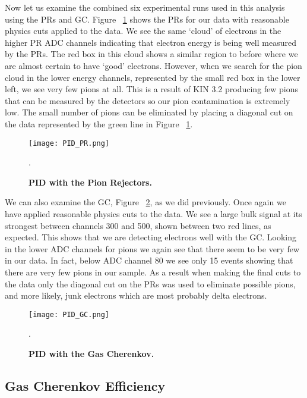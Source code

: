 Now let us examine the combined six experimental runs used in this analysis using the PRs and GC. Figure ~\ref{fig:pid_pr} shows the PRs for our data with reasonable physics cuts applied to the data. We see the same `cloud' of electrons in the higher PR ADC channels indicating that electron energy is being well measured by the PRs. The red box in this cloud shows a similar region to before where we are almost certain to have `good' electrons. However, when we search for the pion cloud in the lower energy channels, represented by the small red box in the lower left, we see very few pions at all. This is a result of KIN 3.2 producing few pions that can be measured by the detectors so our pion contamination is extremely low. The small number of pions can be eliminated by placing a diagonal cut on the data represented by the green line in Figure ~\ref{fig:pid_pr}.

\begin{figure}[!ht]
\begin{center}
\texttt{[image: PID\_PR.png]}
\end{center}
\caption{
{\bf{PID with the Pion Rejectors.}} }.
\label{fig:pid_pr}
\end{figure}

We can also examine the GC, Figure ~\ref{fig:pid_gc}, as we did previously. Once again we have applied reasonable physics cuts to the data. We see a large bulk signal at its strongest between channels 300 and 500, shown between two red lines, as expected. This shows that we are detecting electrons well with the GC. Looking in the lower ADC channels for pions we again see that there seem to be very few in our data. In fact, below ADC channel 80 we see only 15 events showing that there are very few pions in our sample. As a result when making the final cuts to the data only the diagonal cut on the PRs was used to eliminate possible pions, and more likely, junk electrons which are most probably delta electrons.

\begin{figure}[!ht]
\begin{center}
\texttt{[image: PID\_GC.png]}
\end{center}
\caption{
{\bf{PID with the Gas Cherenkov.}} }.
\label{fig:pid_gc}
\end{figure}

\subsection{Gas Cherenkov Efficiency}
\label{ssec:gc_eff}

